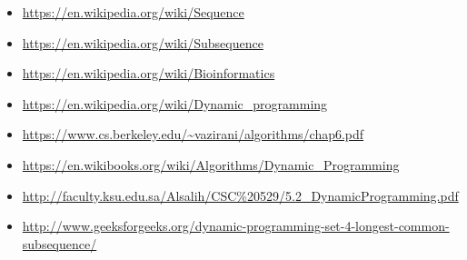 \documentclass{article}
\begin{document}
	\begin{itemize}
		\item \url{https://en.wikipedia.org/wiki/Sequence}	
		\item \url{https://en.wikipedia.org/wiki/Subsequence}	
		\item \url{https://en.wikipedia.org/wiki/Bioinformatics}	
		\item \url{https://en.wikipedia.org/wiki/Dynamic_programming}	
		\item \url{https://www.cs.berkeley.edu/~vazirani/algorithms/chap6.pdf}	
		\item \url{https://en.wikibooks.org/wiki/Algorithms/Dynamic_Programming}	
		\item \url{http://faculty.ksu.edu.sa/Alsalih/CSC%20529/5.2_DynamicProgramming.pdf}	
		\item \url{http://www.geeksforgeeks.org/dynamic-programming-set-4-longest-common-subsequence/}	
		
		
		
	\end{itemize}
\end{document}
